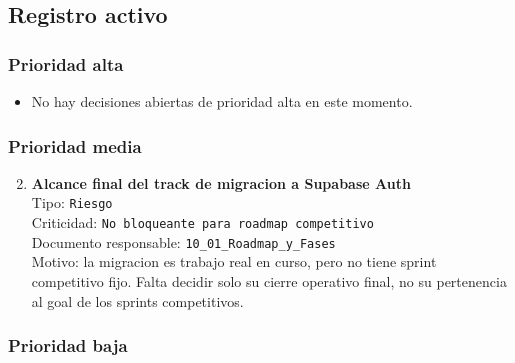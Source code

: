 \subsection{Registro activo}

\subsubsection{Prioridad alta}

\begin{itemize}
  \item No hay decisiones abiertas de prioridad alta en este momento.
\end{itemize}

\subsubsection{Prioridad media}

\begin{enumerate}
  \setcounter{enumi}{1}
  \item \textbf{Alcance final del track de migracion a Supabase Auth}\\
  Tipo: \texttt{Riesgo}\\
  Criticidad: \texttt{No bloqueante para roadmap competitivo}\\
  Documento responsable: \texttt{10\_01\_Roadmap\_y\_Fases}\\
  Motivo: la migracion es trabajo real en curso, pero no tiene sprint competitivo fijo. Falta decidir solo su cierre operativo final, no su pertenencia al goal de los sprints competitivos.
\end{enumerate}

\subsubsection{Prioridad baja}


